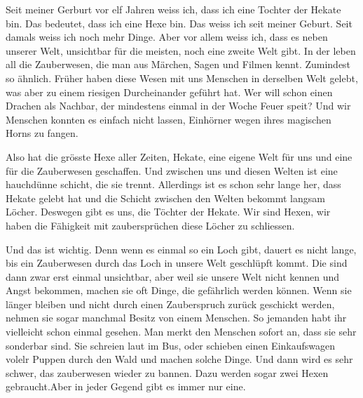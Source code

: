 Seit meiner Gerburt vor elf Jahren weiss ich, dass ich eine Tochter der Hekate bin. Das bedeutet, dass ich eine Hexe bin. Das weiss ich seit meiner Geburt. Seit damals weiss ich noch mehr Dinge. Aber vor allem weiss ich, dass es neben unserer Welt, unsichtbar für die meisten, noch eine zweite Welt gibt. In der leben all die Zauberwesen, die man aus Märchen, Sagen und Filmen kennt. Zumindest so ähnlich. Früher haben diese Wesen mit uns Menschen in derselben Welt gelebt, was aber zu einem riesigen Durcheinander geführt hat. Wer will schon einen Drachen als Nachbar, der mindestens einmal in der Woche Feuer speit? Und wir Menschen konnten es einfach nicht lassen, Einhörner wegen ihres magischen Horns zu fangen.

Also hat die grösste Hexe aller Zeiten, Hekate, eine eigene Welt für uns und eine für die Zauberwesen geschaffen. Und zwischen uns und diesen Welten ist eine hauchdünne schicht, die sie trennt. Allerdings ist es schon sehr lange her, dass Hekate gelebt hat und die Schicht zwischen den Welten bekommt langsam Löcher. Deswegen gibt es uns, die Töchter der Hekate. Wir sind Hexen, wir haben die Fähigkeit mit zaubersprüchen diese Löcher zu schliessen.

Und das ist wichtig. Denn wenn es einmal so ein Loch gibt, dauert es nicht lange, bis ein Zauberwesen durch das Loch in unsere Welt geschlüpft kommt. Die sind dann zwar erst einmal unsichtbar, aber weil sie unsere Welt nicht kennen und Angst bekommen, machen sie oft Dinge, die gefährlich werden können. Wenn sie länger bleiben und nicht durch einen Zauberspruch zurück geschickt werden, nehmen sie sogar manchmal Besitz von einem Menschen. So jemanden habt ihr vielleicht schon einmal gesehen. Man merkt den Menschen sofort an, dass sie sehr sonderbar sind. Sie schreien laut im Bus, oder schieben einen Einkaufswagen volelr Puppen durch den Wald und machen solche Dinge. Und dann wird es sehr schwer, das zauberwesen wieder zu bannen. Dazu werden sogar zwei Hexen gebraucht.Aber in jeder Gegend gibt es immer nur eine.


